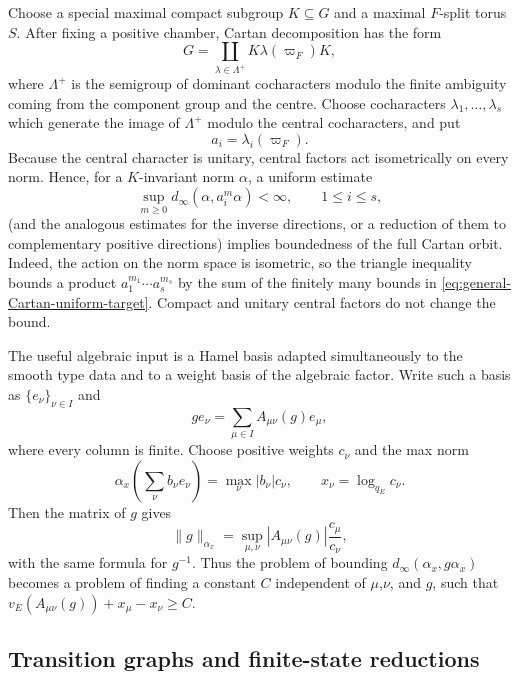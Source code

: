 \documentclass[12pt]{article}
\theoremstyle{definition}
\theoremstyle{remark}
\begin{document}
Choose a special maximal compact subgroup $K\subseteq G$ and a maximal
$F$-split torus $S$.  After fixing a positive chamber, Cartan decomposition
has the form
\[
 G=\coprod_{\lambda\in\Lambda^+}K\lambda(\varpi_F)K,
\]
where $\Lambda^+$ is the semigroup of dominant cocharacters modulo the
finite ambiguity coming from the component group and the centre.  Choose
cocharacters $\lambda_1,\ldots,\lambda_s$ which generate the image of
$\Lambda^+$ modulo the central cocharacters, and put
\[
 a_i=\lambda_i(\varpi_F).
\]
Because the central character is unitary, central factors act isometrically
on every norm.  Hence, for a $K$-invariant norm $\alpha$, a uniform estimate
\begin{equation}\label{eq:general-Cartan-uniform-target}
 \sup_{m\geq0}d_\infty(\alpha,a_i^m\alpha)<\infty,
 \qquad 1\leq i\leq s,
\end{equation}
(and the analogous estimates for the inverse directions, or a reduction of
them to complementary positive directions) implies boundedness of the full
Cartan orbit.  Indeed, the action on the norm space is isometric, so the
triangle inequality bounds a product
$a_1^{m_1}\cdots a_s^{m_s}$ by the sum of the finitely many bounds in
\eqref{eq:general-Cartan-uniform-target}.  Compact and unitary central
factors do not change the bound.

The useful algebraic input is a Hamel basis adapted simultaneously to the
smooth type data and to a weight basis of the algebraic factor.  Write such a
basis as $\{e_\nu\}_{\nu\in I}$ and
\begin{equation}\label{eq:general-matrix-coefficients}
 ge_\nu=\sum_{\mu\in I}A_{\mu\nu}(g)e_\mu,
\end{equation}
where every column is finite.  Choose positive weights $c_\nu$ and the max
norm
\[
 \alpha_x\!\left(\sum_\nu b_\nu e_\nu\right)
 =\max_\nu |b_\nu|c_\nu,
 \qquad
 x_\nu=\log_{q_E}c_\nu.
\]
Then the matrix of $g$ gives
\begin{equation}\label{eq:general-weighted-matrix-bound}
 \|g\|_{\alpha_x}
 =\sup_{\mu,\nu}
 |A_{\mu\nu}(g)|\frac{c_\mu}{c_\nu},
\end{equation}
with the same formula for $g^{-1}$.  Thus the problem of bounding
$d_\infty(\alpha_x,g\alpha_x)$ becomes a problem of finding a constant $C$ independent of $\mu$,$\nu$, and $g$, such that $v_E(A_{\mu\nu}(g)) + x_{\mu} - x_{\nu} \geq C$.

\subsection{Transition graphs and finite-state reductions}
\end{document}
